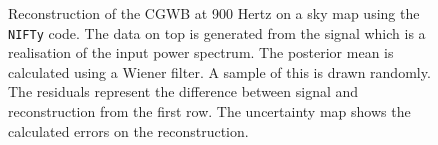 \begin{figure}[h]
    \centering
    \newline
    \vspace{-1cm}
    \caption{Reconstruction of the CGWB at 900 Hertz on a sky map using the {\tt NIFTy} code. The data on top is generated from the signal which is a realisation of the input power spectrum. The posterior mean is calculated using a Wiener filter. A sample of this is drawn randomly. The residuals represent the difference between signal and reconstruction from the first row. The uncertainty map shows the calculated errors on the reconstruction.}
    \label{sky_maps_cosmo}
\end{figure}

